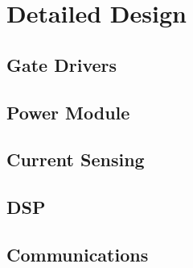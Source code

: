 \chapter{Detailed Design}

\section{Gate Drivers}

\section{Power Module}

\section{Current Sensing}

\section{DSP}

\section{Communications}
